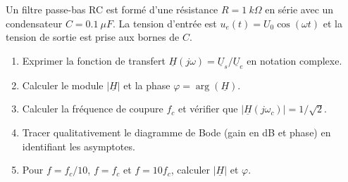 \documentclass[12pt,a4paper]{article}
\begin{document}
\begin{boiteexercice}
Un filtre passe-bas RC est formé d'une résistance $R=\qty{1}{k\Omega}$ en série avec un condensateur $C=\qty{0.1}{\mu F}$. La tension d'entrée est $u_e(t) = U_0\cos(\omega t)$ et la tension de sortie est prise aux bornes de $C$.
\begin{enumerate}
  \item Exprimer la fonction de transfert $\underline{H}(j\omega) = \underline{U}_s/\underline{U}_e$ en notation complexe.
  \item Calculer le module $|\underline{H}|$ et la phase $\varphi = \arg(\underline{H})$.
  \item Calculer la fréquence de coupure $f_c$ et vérifier que $|\underline{H}(j\omega_c)| = 1/\sqrt{2}$.
  \item Tracer qualitativement le diagramme de Bode (gain en dB et phase) en identifiant les asymptotes.
  \item Pour $f=f_c/10$, $f=f_c$ et $f=10f_c$, calculer $|\underline{H}|$ et $\varphi$.
\end{enumerate}
\end{boiteexercice}
\end{document}
